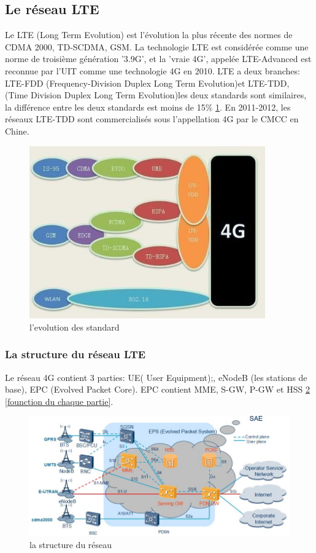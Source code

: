 \subsection{Le réseau LTE}
Le LTE (Long Term Evolution) est l'évolution la plus récente des normes de CDMA 2000, TD-SCDMA, GSM. La technologie LTE est considérée comme une norme de troisième génération '3.9G', et la 'vraie 4G', appelée LTE-Advanced est reconnue par l'UIT comme une technologie 4G en 2010. LTE a deux branches: LTE-FDD (Frequency-Division Duplex  Long Term Evolution)et LTE-TDD, (Time Division Duplex Long Term Evolution)les deux standards sont similaires, la différence entre les deux standards est moins de 15\% \ref{evolution}. En 2011-2012, les réseaux LTE-TDD sont commercialisés sous l'appellation 4G par le CMCC en Chine.
      \begin{figure}[H]
          \centering
          \includegraphics[width=4in]{images/evolution.JPG}
          \caption{l'evolution des standard}
          \label{evolution}
      \end{figure}
      
\subsubsection{La structure du réseau LTE}
Le réseau 4G contient 3 parties: UE( User Equipment);, eNodeB (les stations de base), EPC (Evolved Packet Core). EPC contient MME, S-GW, P-GW et HSS \ref{structure4G}  \ref{founction du chaque partie}. 
    
      \begin{figure}[H]
          \centering
          \includegraphics[width=5in]{images/enb2.jpg}
          \caption{la structure du réseau}
          \label{structure4G}
      \end{figure}
      
